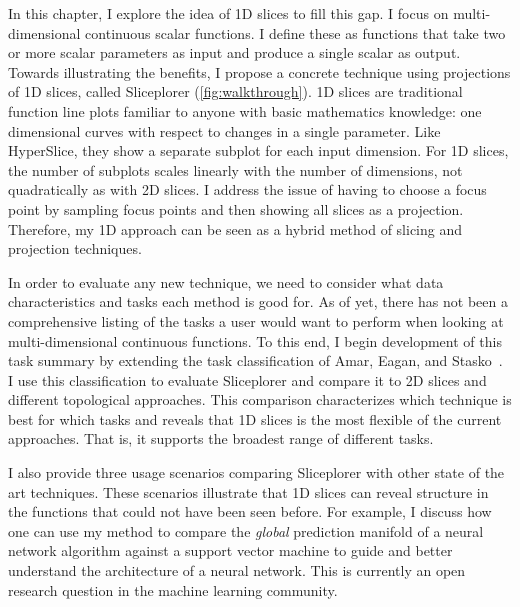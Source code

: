 
In this chapter, I explore the idea of 1D slices to fill this gap. I focus on 
multi-dimensional continuous scalar functions. I define these as functions that take two or more
scalar parameters as input and produce a single scalar as output.
Towards illustrating the benefits, I propose a concrete technique using projections of 1D slices, called Sliceplorer (\autoref{fig:walkthrough}). 
1D slices are traditional function line plots familiar to anyone with
basic mathematics knowledge: one dimensional curves with respect to
changes in a single parameter. 
Like HyperSlice, they show a separate subplot
for each input dimension. For 1D slices, the number of
subplots scales linearly with the number of dimensions, not quadratically as with 2D slices. I address the issue of having to choose a focus
point by sampling focus points and then showing all slices as a
projection. Therefore, my 1D approach can be seen as a hybrid method of slicing
and projection techniques. %

In order to evaluate any new technique, we need to
consider what data characteristics and tasks each method is good for. As of yet, there has not been a comprehensive
listing of the tasks a user would want to perform when looking at
multi-dimensional continuous functions. To this
end, I begin development of this task summary by extending the task
classification of Amar, Eagan, and Stasko~\cite{Amar:2005}. I use this
classification to evaluate Sliceplorer and compare it to 2D slices and
different topological approaches. This comparison characterizes
which technique is best for which tasks and reveals that 1D slices is the most
flexible of the current approaches. That is, it supports the broadest range of
different tasks.

I also provide three usage scenarios comparing Sliceplorer with other state of the art techniques. These scenarios illustrate that 1D
slices can reveal structure in the functions that could not
have been seen before. For example, I discuss how one can use my
method to compare the \emph{global} prediction manifold of a neural
network algorithm against a support vector machine to guide and better understand the architecture of a neural network. This is currently an open research question in the machine learning community.

